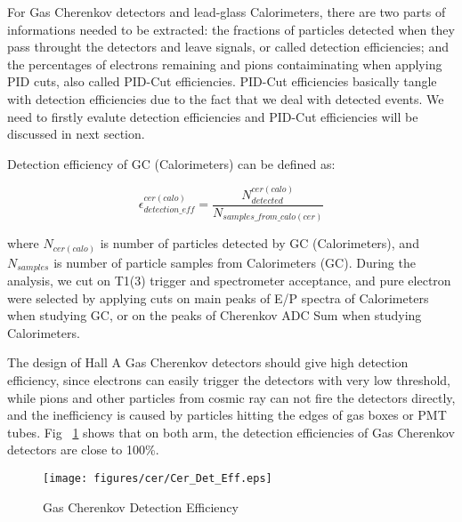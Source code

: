 For Gas Cherenkov detectors and lead-glass Calorimeters, there are two parts of informations needed to be extracted: the fractions of particles detected when they pass throught the detectors and leave signals, or called detection efficiencies; and the percentages of electrons remaining and pions contaiminating when applying PID cuts, also called PID-Cut efficiencies. PID-Cut efficiencies basically tangle with detection efficiencies due to the fact that we deal with detected events. We need to firstly evalute detection efficiencies and PID-Cut efficiencies will be discussed in next section. 

Detection efficiency of GC (Calorimeters) can be defined as:

\begin{equation}
 \epsilon_{detection\_eff}^{cer(calo)} = \frac{N_{detected}^{cer(calo)}}{N_{samples\_from\_calo(cer)}}
\end{equation}

where $N_{cer(calo)}$ is number of particles detected by GC (Calorimeters), and $N_{samples}$ is number of particle samples from Calorimeters (GC). During the analysis, we cut on T1(3) trigger and spectrometer acceptance, and pure electron were selected by applying cuts on main peaks of E/P spectra of Calorimeters when studying GC, or on the peaks of Cherenkov ADC Sum when studying Calorimeters. 

The design of Hall A Gas Cherenkov detectors should give high detection efficiency, since electrons can easily trigger the detectors with very low threshold, while pions and other particles from cosmic ray can not fire the detectors directly, and the inefficiency is caused by particles hitting the edges of gas boxes or PMT tubes. Fig ~\ref{cer_det_eff} shows that on both arm, the detection efficiencies of Gas Cherenkov detectors are close to 100\%.

\begin{figure}[h!]
\centerline{\texttt{[image: figures/cer/Cer\_Det\_Eff.eps]}}
\caption[Gas Cherenkov Detection Efficiency]{\footnotesize{Gas Cherenkov Detection Efficiency}}
\label{cer_det_eff}
\end{figure}

